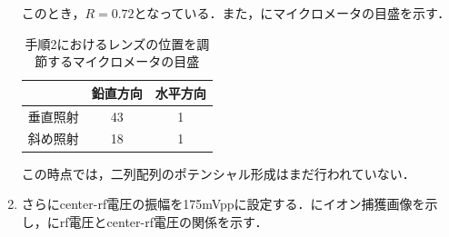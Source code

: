 \begin{enumerate}
このとき，$R=0.72$となっている．また，にマイクロメータの目盛を示す．

\begin{table}[h]
\begin{center}
	\caption{手順2におけるレンズの位置を調節するマイクロメータの目盛}
	\label{tab:3_2D}
	\begin{tabular}{c|cc} \hline \hline
		&鉛直方向&水平方向 \\ \hline
		垂直照射&43 & 1 \\ 
		斜め照射&18 & 1 \\ \hline
	\end{tabular}
\end{center}
\end{table}

この時点では，二列配列のポテンシャル形成はまだ行われていない．

\item さらにcenter-rf電圧の振幅を175mVppに設定する．にイオン捕獲画像を示し，にrf電圧とcenter-rf電圧の関係を示す．


\end{enumerate}
